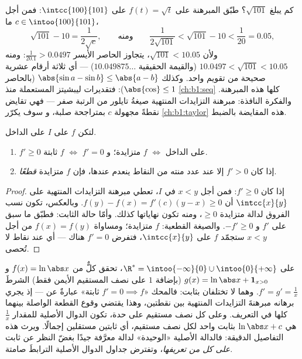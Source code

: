 \begin{example}\label{ex:b1:derivative:mvtestimate}
كم يبلغ $\sqrt{101}$؟ طبّق المبرهنة على $f(t) = \sqrt t$
على $\intcc{100}{101}$: فمن أجل $c \in \intoo{100}{101}$ ما،
\[
\sqrt{101} - 10 = \frac{1}{2\sqrt c},
\qquad\text{ومنه}\qquad
\frac{1}{2\sqrt{101}} < \sqrt{101} - 10 < \frac{1}{20} = 0.05 ,
\]
ولأن $\sqrt{101} < 10.05$، يتجاوز الحاصر الأيسر
$\frac{1}{20.1} > 0.0497$: ومنه $10.0497 < \sqrt{101} < 10.05$
(والقيمة الحقيقية $10.049875\dots$) --- أي ثلاثة أرقام عشرية صحيحة من تقويم
 واحد. وكذلك $\abs{\sin a - \sin b} \leq
\abs{a - b}$ (بالحاصر $\abs{\cos}\leq 1$): فتقديرات ليبشيتز
المستعملة منذ \cref{ch:b1:seq} كلها هذه المبرهنة. والفكرة
النافذة: مبرهنة التزايدات المنتهية صيغةُ تايلور من الرتبة صفر
--- فهي تقايض نقطةً مجهولة $c$ بمتراجحة صلبة، و
سوف يكرّر \cref{ch:b1:taylor} هذه المقايضة بالضبط.
\end{example}

\begin{corollary}\label{cor:b1:derivative:monotone}
لتكن $f$  على $I$  على الداخل.
\begin{enumerate}
  \item $f' \geq 0$ على الداخل $\iff$ $f$ متزايدة؛ و $f' = 0$
        $\iff$ $f$ ثابتة.
  \item إذا كان $f' > 0$ إلا عند عدد منته من النقاط ينعدم عندها،
        فإن $f$ متزايدة \emph{قطعًا}.
\end{enumerate}
\end{corollary}

\begin{proof}
إذا كان $f' \geq 0$: فمن أجل $x < y$ في $I$، تعطي مبرهنة التزايدات المنتهية على
$\intcc{x}{y}$ أن $f(y) - f(x) = f'(c)(y - x) \geq 0$. وبالعكس،
تكون نسب الفروق لدالة متزايدة $\geq 0$، ومنه تكون
نهاياتها كذلك. وأمّا حالة الثابت: فطبّق ما سبق على $f'$ و
$-f' \geq 0$. والصيغة القطعية: $f$ متزايدة؛ ومساواة $f(x) =
f(y)$ من أجل $x < y$ ستجمّد $f$ على $\intcc{x}{y}$، فتفرض $f' =
0$ هناك --- أي عند نقاط لا تُحصى.
\end{proof}

\begin{example}\label{ex:b1:derivative:intervalmatters}
على $\R^* = \intoo{-\infty}{0} \cup \intoo{0}{+\infty}$، تحقق كلٌّ من
$f(x) = \ln\abs x$ و $g(x) = \ln\abs x + \mathbf{1}_{x>0}$
(بإضافة $1$ على نصف المستقيم الأيمن فقط) الشرطَ $f' = g' =
\frac1x$. وهما لا تختلفان بثابت: فالمحك
«$f' = 0 \implies f$ ثابتة» عبارةٌ عن \emph{}
--- إذ يجري برهانه مبرهنةَ التزايدات المنتهية بين نقطتين،
وهذا يقتضي وقوع القطعة الواصلة بينهما كلها في
 التعريف. وعلى كل نصف مستقيم على حدة، تكون الدوال الأصلية
للمقدار $\frac1x$ هي $\ln\abs x + c$ بثابت واحد لكل نصف مستقيم،
أي ثابتين مستقلين إجمالًا. ويرث 
هذه التفاصيل الدقيقة: فالدالة الأصلية «الوحيدة» لدالة
معرَّفة جيدًا بغضّ النظر عن ثابت \emph{على كل  من
 تعريفها}، وتفترض جداول الدوال الأصلية الترابطَ صامتة.
\end{example}

